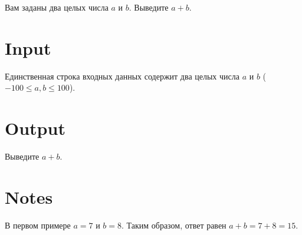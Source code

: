 
Вам заданы два целых числа $a$ и $b$. Выведите $a+b$.

\section*{Input}
Единственная строка входных данных содержит два целых числа $a$ и $b$ ($-100 \le a,b \le 100$).

\section*{Output}
Выведите $a+b$.

\section*{Notes}
В первом примере $a=7$ и $b=8$. Таким образом, ответ равен $a+b=7+8=15$.
